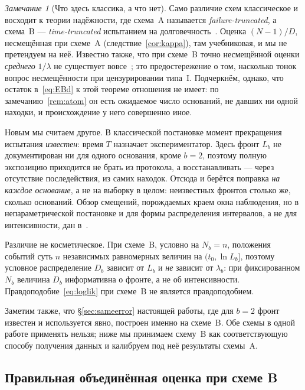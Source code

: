 \documentclass[11pt,a4paper]{article}
\theoremstyle{plain}
\theoremstyle{remark}
\newtheorem{remark}{Замечание}
\begin{document}
\begin{remark}[Что здесь классика, а что нет]\label{rem:priority}
Само различие схем классическое и восходит к теории надёжности, где схема~A
называется \emph{failure-truncated}, а схема~B --- \emph{time-truncated}
испытанием на долговечность~\cite{epstein1954trunc,epsteinsobel1954}. Оценка
$(N-1)/D$, несмещённая при схеме~A (следствие~\ref{cor:kappa}), там
учебниковая, и мы не претендуем на неё. Известно также, что при схеме~B точно
несмещённой оценки \emph{среднего} $1/\lambda$ не существует
вовсе~\cite{bartholomew1963,basu1964}; это предостережение о том, насколько
тонок вопрос несмещённости при цензурировании типа~I. Подчеркнём, однако, что
остаток в~\eqref{eq:EBd} к этой теореме отношения не имеет: по
замечанию~\ref{rem:atom} он есть ожидаемое число оснований, не давших ни одной
находки, и происхождение у него совершенно иное.

Новым мы считаем другое. В классической постановке момент прекращения
испытания \emph{известен}: время $T$ назначает экспериментатор. Здесь фронт
$L_b$ не документирован ни для одного основания, кроме $b=2$, поэтому полную
экспозицию приходится не брать из протокола, а восстанавливать --- через
отсутствие последействия, из самих находок. Отсюда и берётся поправка
\emph{на каждое основание}, а не на выборку в целом: неизвестных фронтов
столько же, сколько оснований. Обзор смещений, порождаемых краем окна
наблюдения, но в непараметрической постановке и для формы распределения
интервалов, а не для интенсивности, дан в~\cite{kivela2015}.
\end{remark}

Различие не косметическое. При схеме~B, условно на $N_b=n$, положения событий суть
$n$ независимых равномерных величин на $(t_0,\ln L_b]$, поэтому условное распределение
$D_b$ зависит от $L_b$ и \emph{не} зависит от $\lambda_b$: при фиксированном $N_b$
величина $D_b$ информативна о фронте, а не об интенсивности. Правдоподобие~\eqref{eq:loglik}
при схеме~B не является правдоподобием.

Заметим также, что \S\ref{sec:sameerror} настоящей работы, где для $b=2$ фронт известен
и используется явно, построен именно на схеме~B. Обе схемы в одной работе применять
нельзя; ниже мы принимаем схему~B как соответствующую способу получения данных
и калибруем под неё результаты схемы~A.

\subsection{Правильная объединённая оценка при схеме B}
\end{document}
